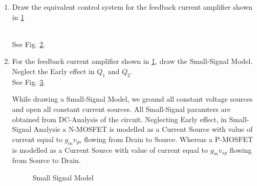 \begin{enumerate}[label=\thesection.\arabic*.,ref=\thesection.\theenumi]

\item Draw the equivalent control system for the feedback current amplifier shown in \ref{fig:ee18btech11014_Input}
\renewcommand{\thefigure}{\theenumi.\arabic{figure}}
\begin{figure}[h!]
	\begin{center}
		\resizebox{\columnwidth/1}{!}{}
	\end{center}
	\caption{}
	\label{fig:ee18btech11014_Input}
\end{figure}
\\
\solution See Fig. 	\ref{fig:ee18btech11014_Control_System}.

\begin{figure}[ht!]
	\begin{center}
		\resizebox{\columnwidth}{!}{}
	\end{center}
	\caption{}
	\label{fig:ee18btech11014_Control_System}
\end{figure}
\renewcommand{\thefigure}{\theenumi}
\item For the feedback current amplifier shown in \ref{fig:ee18btech11014_Input}, draw the Small-Signal Model. Neglect the Early effect in $Q_{1}$ and $Q_{2}$.\\
\solution See Fig. 	\ref{fig:ee18btech11014_Small_Signal}.

While drawing a Small-Signal Model, we ground all constant voltage sources and open all constant current sources. All Small-Signal paramters are obtained from DC-Analysis of the circuit. Neglecting Early effect, in Small-Signal Analysis a N-MOSFET is modelled as a Current Source with value of current equal to $g_{m}v_{gs}$ flowing from Drain to Source. Whereas a P-MOSFET is modelled as a Current Source with value of current equal to $g_{m}v_{sg}$ flowing from Source to Drain.
\begin{figure}[h!]
	\begin{center}
		\resizebox{\columnwidth/1}{!}{}
	\end{center}
	\caption{Small Signal Model}
	\label{fig:ee18btech11014_Small_Signal}
\end{figure}



\end{enumerate}
